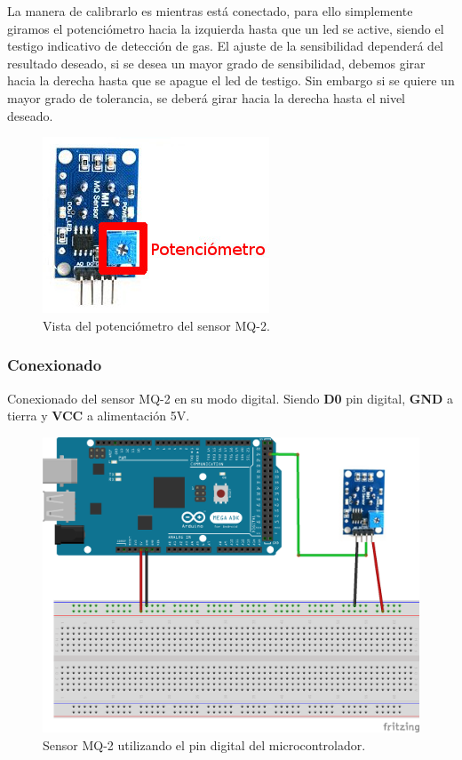 La manera de calibrarlo es mientras está conectado, para ello simplemente giramos el potenciómetro hacia la izquierda hasta que un led se active, siendo
el testigo indicativo de detección de gas. El ajuste de la sensibilidad dependerá del resultado deseado, si se desea un mayor grado de sensibilidad, debemos girar hacia la derecha
hasta que se apague el led de testigo. Sin embargo si se quiere un mayor grado de tolerancia, se deberá girar hacia la derecha hasta el nivel deseado.\\

\begin{figure}[H]
  \begin{center}
    \includegraphics[scale=0.6]{imagenes/mq2_trasera.jpg}
  \end{center}
  \caption{Vista del potenciómetro del sensor MQ-2.}
  \label{figura:sensor_mq_2_potenciometro}
\end{figure}

\subsubsection{Conexionado}

Conexionado del sensor MQ-2 en su modo digital. Siendo \textbf{D0} pin digital, \textbf{GND} a tierra y \textbf{VCC} a alimentación 5V.\\

\begin{figure}[H]
  \begin{center}
    \includegraphics[scale=0.5]{imagenes/mq_2_conexionado.png}
  \end{center}
  \caption{Sensor MQ-2 utilizando el pin digital del microcontrolador.}
  \label{figura:mq_2_conexionado}
\end{figure}


